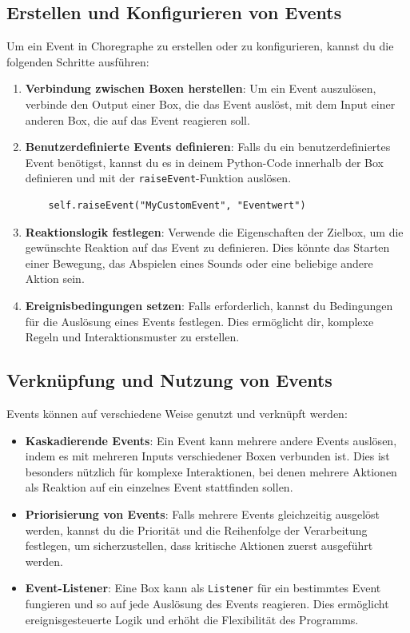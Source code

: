 \subsection{Erstellen und Konfigurieren von Events}
Um ein Event in Choregraphe zu erstellen oder zu konfigurieren, kannst du die folgenden Schritte ausführen:
\begin{enumerate}
    \item \textbf{Verbindung zwischen Boxen herstellen}: Um ein Event auszulösen, verbinde den Output einer Box, die das Event auslöst, mit dem Input einer anderen Box, die auf das Event reagieren soll.
    \item \textbf{Benutzerdefinierte Events definieren}: Falls du ein benutzerdefiniertes Event benötigst, kannst du es in deinem Python-Code innerhalb der Box definieren und mit der \texttt{raiseEvent}-Funktion auslösen.
    \begin{verbatim}
    self.raiseEvent("MyCustomEvent", "Eventwert")
    \end{verbatim}
    \item \textbf{Reaktionslogik festlegen}: Verwende die Eigenschaften der Zielbox, um die gewünschte Reaktion auf das Event zu definieren. Dies könnte das Starten einer Bewegung, das Abspielen eines Sounds oder eine beliebige andere Aktion sein.
    \item \textbf{Ereignisbedingungen setzen}: Falls erforderlich, kannst du Bedingungen für die Auslösung eines Events festlegen. Dies ermöglicht dir, komplexe Regeln und Interaktionsmuster zu erstellen.
\end{enumerate}

\subsection{Verknüpfung und Nutzung von Events}
Events können auf verschiedene Weise genutzt und verknüpft werden:
\begin{itemize}
    \item \textbf{Kaskadierende Events}: Ein Event kann mehrere andere Events auslösen, indem es mit mehreren Inputs verschiedener Boxen verbunden ist. Dies ist besonders nützlich für komplexe Interaktionen, bei denen mehrere Aktionen als Reaktion auf ein einzelnes Event stattfinden sollen.
    \item \textbf{Priorisierung von Events}: Falls mehrere Events gleichzeitig ausgelöst werden, kannst du die Priorität und die Reihenfolge der Verarbeitung festlegen, um sicherzustellen, dass kritische Aktionen zuerst ausgeführt werden.
    \item \textbf{Event-Listener}: Eine Box kann als \texttt{Listener} für ein bestimmtes Event fungieren und so auf jede Auslösung des Events reagieren. Dies ermöglicht ereignisgesteuerte Logik und erhöht die Flexibilität des Programms.
\end{itemize}

